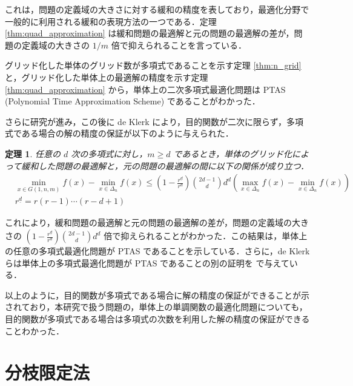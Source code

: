 \documentclass[a4paper,11pt]{jreport}
\newtheorem{theorem}{定理}
\begin{document}
これは，問題の定義域の大きさに対する緩和の精度を表しており，最適化分野で一般的に利用される緩和の表現方法の一つである．定理 \ref{thm:quad_approximation} は緩和問題の最適解と元の問題の最適解の差が，問題の定義域の大きさの $ 1 / m $ 倍で抑えられることを言っている．\par
グリッド化した単体のグリッド数が多項式であることを示す定理 \ref{thm:n_grid} と，グリッド化した単体上の最適解の精度を示す定理 \ref{thm:quad_approximation} から，単体上の二次多項式最適化問題は PTAS (Polynomial Time Approximation Scheme) であることがわかった．\par
さらに研究が進み，この後に de Klerk \cite{deklerk_poly} により，目的関数が二次に限らず，多項式である場合の解の精度の保証が以下のように与えられた．\par

\begin{theorem} \label{thm:poly_approximation}
任意の $ d $ 次の多項式に対し，$ m \geq d $ であるとき，単体のグリッド化によって緩和した問題の最適解と，元の問題の最適解の間に以下の関係が成り立つ．
\begin{align*}
& \min_{x \in G(1, n, m)} f(x) - \min_{x \in \Delta_n} f(x) \leq \left( 1 - \frac{r^{\underline{d}}}{r^d} \right) \binom{2d - 1}{d} d^d \left( \max_{x \in \Delta_n} f(x) - \min_{x \in \Delta_n} f(x) \right) \\
& r^{\underline{d}} = r (r - 1) \cdots (r - d + 1)
\end{align*}
\end{theorem}

これにより，緩和問題の最適解と元の問題の最適解の差が，問題の定義域の大きさの $ \left( 1 - \frac{r^{\underline{d}}}{r^d} \right) \binom{2d - 1}{d} d^d $ 倍で抑えられることがわかった．この結果は，単体上の任意の多項式最適化問題が PTAS であることを示している．さらに，de Klerk らは単体上の多項式最適化問題が PTAS であることの別の証明を \cite{deklerk_alternative} で与えている．\par
以上のように，目的関数が多項式である場合に解の精度の保証ができることが示されており，本研究で扱う問題の，単体上の単調関数の最適化問題についても，目的関数が多項式である場合は多項式の次数を利用した解の精度の保証ができることわかった．\par

\section{分枝限定法} \label{sec:bnb}
\end{document}

